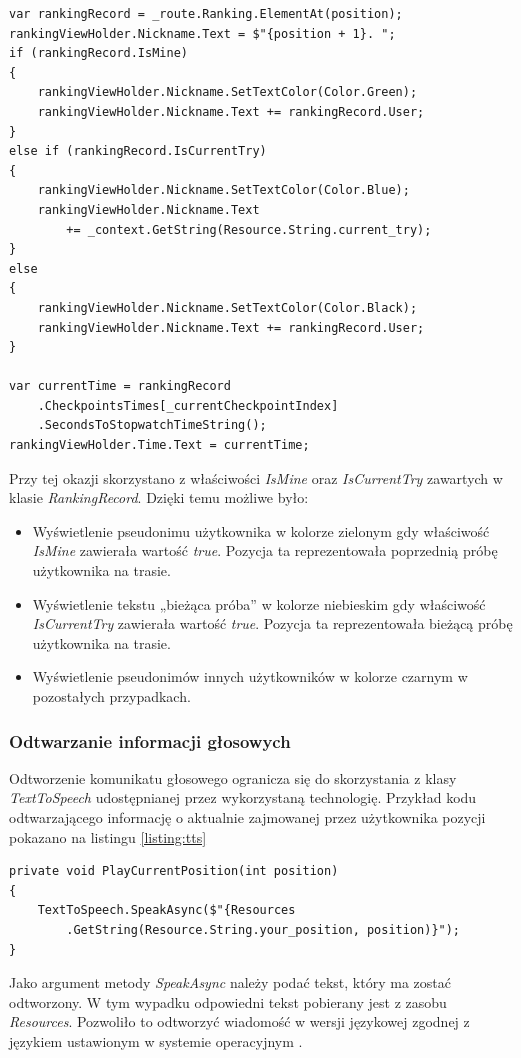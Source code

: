 \begin{lstlisting}[caption={Wyświetlanie rankingu},label=listing:adapter]
var rankingRecord = _route.Ranking.ElementAt(position);
rankingViewHolder.Nickname.Text = $"{position + 1}. ";
if (rankingRecord.IsMine)
{
    rankingViewHolder.Nickname.SetTextColor(Color.Green);
    rankingViewHolder.Nickname.Text += rankingRecord.User;
}
else if (rankingRecord.IsCurrentTry)
{
    rankingViewHolder.Nickname.SetTextColor(Color.Blue);
    rankingViewHolder.Nickname.Text 
    	+= _context.GetString(Resource.String.current_try);
}
else
{
    rankingViewHolder.Nickname.SetTextColor(Color.Black);
    rankingViewHolder.Nickname.Text += rankingRecord.User;
}

var currentTime = rankingRecord
	.CheckpointsTimes[_currentCheckpointIndex]
	.SecondsToStopwatchTimeString();
rankingViewHolder.Time.Text = currentTime;
\end{lstlisting}
Przy tej okazji skorzystano z właściwości \textit{IsMine} oraz \textit{IsCurrentTry} zawartych w klasie \textit{RankingRecord}. Dzięki temu możliwe było:
\begin{itemize}
\item{Wyświetlenie pseudonimu użytkownika w kolorze zielonym gdy właściwość \textit{IsMine} zawierała wartość \textit{true}. Pozycja ta reprezentowała poprzednią próbę użytkownika na trasie.}
\item{Wyświetlenie tekstu  „bieżąca próba” w kolorze niebieskim gdy właściwość \textit{IsCurrentTry} zawierała wartość \textit{true}. Pozycja ta reprezentowała bieżącą próbę użytkownika na trasie.} 
\item{Wyświetlenie pseudonimów innych użytkowników w kolorze czarnym w pozostałych przypadkach}.
\end{itemize}

\subsubsection{Odtwarzanie informacji głosowych}
Odtworzenie komunikatu głosowego ogranicza się do skorzystania z klasy \textit {TextToSpeech} udostępnianej przez wykorzystaną technologię. Przykład kodu odtwarzającego informację o aktualnie zajmowanej przez użytkownika pozycji pokazano na listingu \ref{listing:tts}
\begin{lstlisting}[caption={Odtworzenie informacji głosowej o aktualnie zajmowanej pozycji},label=listing:tts]
private void PlayCurrentPosition(int position)
{
    TextToSpeech.SpeakAsync($"{Resources
    	.GetString(Resource.String.your_position, position)}");
}
\end{lstlisting}
Jako argument metody \textit{SpeakAsync} należy podać tekst, który ma zostać odtworzony. W tym wypadku odpowiedni tekst pobierany jest z zasobu \textit{Resources}. Pozwoliło to odtworzyć wiadomość w wersji językowej zgodnej z językiem ustawionym w systemie operacyjnym \cite{resources}.

